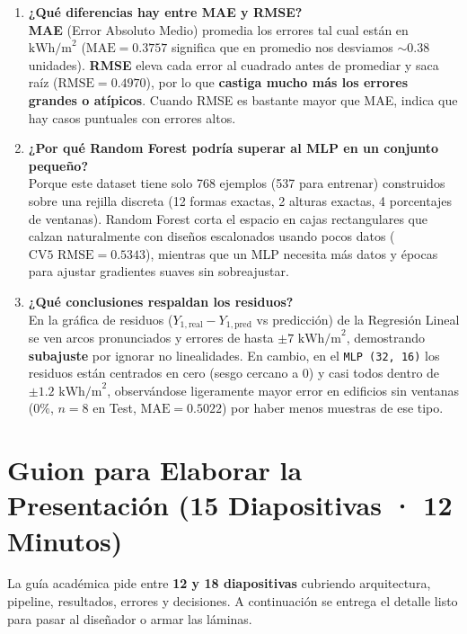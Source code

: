 \documentclass[11pt,a4paper]{article}
\begin{document}
\begin{enumerate}[leftmargin=1.4em,itemsep=7pt]
    \item \textbf{¿Qué diferencias hay entre MAE y RMSE?}\\
    \textbf{MAE} (Error Absoluto Medio) promedia los errores tal cual están en $\text{kWh/m}^2$ ($\text{MAE}=0.3757$ significa que en promedio nos desviamos $\sim 0.38$ unidades). \textbf{RMSE} eleva cada error al cuadrado antes de promediar y saca raíz ($\text{RMSE}=0.4970$), por lo que \textbf{castiga mucho más los errores grandes o atípicos}. Cuando RMSE es bastante mayor que MAE, indica que hay casos puntuales con errores altos.

    \item \textbf{¿Por qué Random Forest podría superar al MLP en un conjunto pequeño?}\\
    Porque este dataset tiene solo 768 ejemplos (537 para entrenar) construidos sobre una rejilla discreta (12 formas exactas, 2 alturas exactas, 4 porcentajes de ventanas). Random Forest corta el espacio en cajas rectangulares que calzan naturalmente con diseños escalonados usando pocos datos ($\text{CV5 RMSE} = 0.5343$), mientras que un MLP necesita más datos y épocas para ajustar gradientes suaves sin sobreajustar.

    \item \textbf{¿Qué conclusiones respaldan los residuos?}\\
    En la gráfica de residuos ($Y_{1,\text{real}} - Y_{1,\text{pred}}$ vs predicción) de la Regresión Lineal se ven arcos pronunciados y errores de hasta $\pm 7\text{ kWh/m}^2$, demostrando \textbf{subajuste} por ignorar no linealidades. En cambio, en el \texttt{MLP (32, 16)} los residuos están centrados en cero (sesgo cercano a $0$) y casi todos dentro de $\pm 1.2\text{ kWh/m}^2$, observándose ligeramente mayor error en edificios sin ventanas ($0\%$, $n=8$ en Test, $\text{MAE}=0.5022$) por haber menos muestras de ese tipo.
\end{enumerate}

\section{Guion para Elaborar la Presentación (15 Diapositivas · 12 Minutos)}

La guía académica pide entre \textbf{12 y 18 diapositivas} cubriendo arquitectura, pipeline, resultados, errores y decisiones. A continuación se entrega el detalle listo para pasar al diseñador o armar las láminas.
\end{document}
